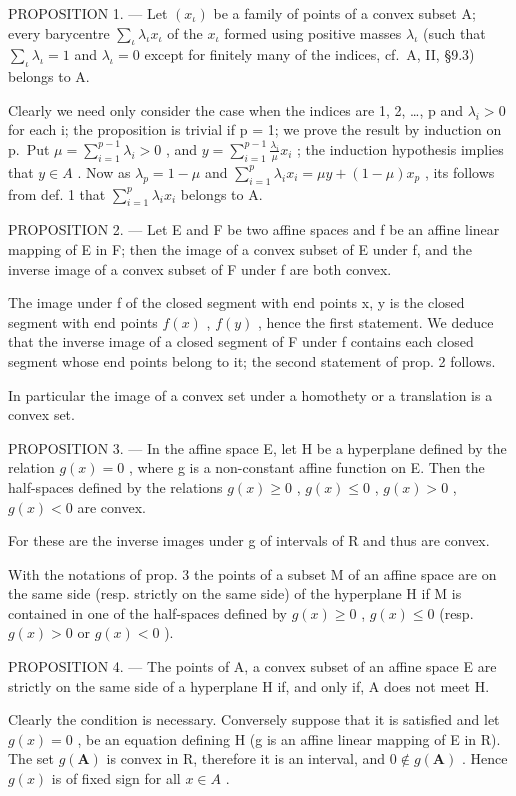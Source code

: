 PROPOSITION 1. --- Let \((x_{\iota})\) be a family of points of a convex subset A; every barycentre \(\sum_{\iota} \lambda_{\iota} x_{\iota}\) of the \(x_{\iota}\) formed using positive masses \(\lambda_{\iota}\) (such that \(\sum_{\iota} \lambda_{\iota} = 1\) and \(\lambda_{\iota} = 0\) except for finitely many of the indices, cf.~A, II, §9.3) belongs to A.

Clearly we need only consider the case when the indices are 1, 2, \ldots, p and \(\lambda_{i} > 0\) for each i; the proposition is trivial if p = 1; we prove the result by induction on p.~Put \(\mu = \sum_{i=1}^{p-1} \lambda_{i} > 0\) , and \(y = \sum_{i=1}^{p-1} \frac{\lambda_{i}}{\mu} x_{i}\) ; the induction hypothesis implies that \(y \in A\) . Now as \(\lambda_{p} = 1 - \mu\) and \(\sum_{i=1}^{p} \lambda_{i} x_{i} = \mu y + (1 - \mu) x_{p}\) , its follows from def. 1 that \(\sum_{i=1}^{p} \lambda_{i} x_{i}\) belongs to A.

PROPOSITION 2. --- Let E and F be two affine spaces and f be an affine linear mapping of E in F; then the image of a convex subset of E under f, and the inverse image of a convex subset of F under f are both convex.

The image under f of the closed segment with end points x, y is the closed segment with end points \(f(x)\) , \(f(y)\) , hence the first statement. We deduce that the inverse image of a closed segment of F under f contains each closed segment whose end points belong to it; the second statement of prop. 2 follows.

In particular the image of a convex set under a homothety or a translation is a convex set.

PROPOSITION 3. --- In the affine space E, let H be a hyperplane defined by the relation \(g(x) = 0\) , where g is a non-constant affine function on E. Then the half-spaces defined by the relations \(g(x) \geqslant 0\) , \(g(x) \leqslant 0\) , \(g(x) > 0\) , \(g(x) < 0\) are convex.

For these are the inverse images under g of intervals of R and thus are convex.

With the notations of prop. 3 the points of a subset M of an affine space are on the same side (resp. strictly on the same side) of the hyperplane H if M is contained in one of the half-spaces defined by \(g(x) \geqslant 0\) , \(g(x) \leqslant 0\) (resp. \(g(x) > 0\) or \(g(x) < 0\) ).

PROPOSITION 4. --- The points of A, a convex subset of an affine space E are strictly on the same side of a hyperplane H if, and only if, A does not meet H.

Clearly the condition is necessary. Conversely suppose that it is satisfied and let \(g(x) = 0\) , be an equation defining H (g is an affine linear mapping of E in R). The set \(g(\mathbf{A})\) is convex in R, therefore it is an interval, and \(0 \notin g(\mathbf{A})\) . Hence \(g(x)\) is of fixed sign for all \(x \in A\) .

